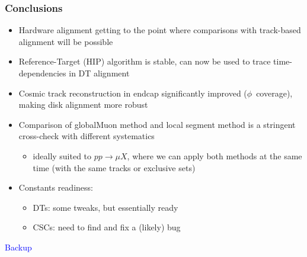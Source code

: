 \documentclass[compress]{beamer}
\begin{document}
\begin{frame}
\frametitle{Conclusions}
\begin{itemize}\setlength{\itemsep}{0.2 cm}
\item Hardware alignment getting to the point where comparisons with track-based alignment will be possible
\item Reference-Target (HIP) algorithm is stable, can now be used to
  trace time-dependencies in DT alignment
\item Cosmic track reconstruction in endcap significantly improved \mbox{($\phi$ coverage)},
  making disk alignment more robust
\item Comparison of globalMuon method and local segment method is a
  stringent cross-check with different systematics
\begin{itemize}
\item ideally suited to $pp \to \mu X$, where we can apply both methods at the same time (with the same tracks or exclusive sets)
\end{itemize}
\item Constants readiness:
\begin{itemize}
\item DTs: some tweaks, but essentially ready
\item CSCs: need to find and fix a (likely) bug
\end{itemize}
\end{itemize}
\label{numpages}
\end{frame}

\begin{frame}
\begin{center}
\Huge \textcolor{blue}{Backup}
\end{center}
\end{frame}
\end{document}
